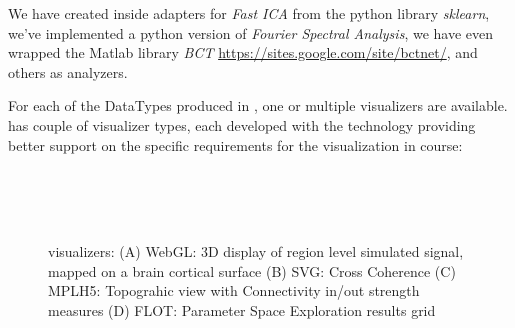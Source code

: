			We have created inside \TVB adapters for \emph{Fast ICA} from the
			python library \emph{sklearn},  we've implemented a python version of
			\emph{Fourier Spectral Analysis},  we have even wrapped the Matlab
			library \emph{BCT} \url{https://sites.google.com/site/bctnet/}, and
			others as analyzers.

			For each of the DataTypes produced in \TVB, one or multiple
			visualizers are available.   \TVB has couple of  visualizer types,
			each developed with the technology providing better support on the
			specific requirements for the visualization in course:

			 \begin{figure}[!htbp]
					\\
					\\
					\\
					\caption{\TVB visualizers: 
					(A) WebGL: 3D display of region level simulated signal, mapped on a brain cortical surface
					(B) SVG: Cross Coherence
					(C) MPLH5:  Topograhic view with Connectivity in/out strength measures
					(D) FLOT: Parameter Space Exploration results grid}
				\label{fig:visualizers}
			\end{figure}
	
